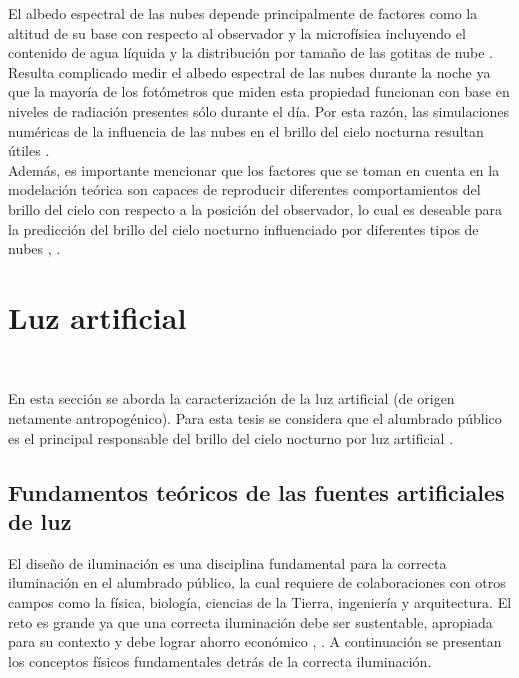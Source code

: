 El albedo espectral de las nubes depende principalmente de factores como la altitud de su base con respecto al observador y la microfísica incluyendo el contenido de agua líquida y la distribución por tamaño de las gotitas de nube \citep{Kocifaj2007}.\\ 

Resulta complicado medir el albedo espectral de las nubes durante la noche ya que la mayoría de los fotómetros que miden esta propiedad funcionan con base en niveles de radiación presentes sólo durante el día. Por esta razón, las simulaciones numéricas de la influencia de las nubes en el brillo del cielo nocturna resultan útiles \citep{Solano2015}.\\

Además, es importante mencionar que los factores que se toman en cuenta en la modelación teórica son capaces de reproducir diferentes comportamientos del brillo del cielo con respecto a la posición del observador, lo cual es deseable para la predicción del brillo del cielo nocturno influenciado por diferentes tipos de nubes \citep{Kocifaj2007}, \citep{Solano2015}.

\newpage

\section{Luz artificial}\\
\label{sec:luzartificial}

En esta sección se aborda la caracterización de la luz artificial (de origen netamente antropogénico). Para esta tesis se considera que el alumbrado público es el principal responsable del brillo del cielo nocturno por luz artificial \citep{Solano2013b}.

\subsection{Fundamentos teóricos de las fuentes artificiales de luz}

El diseño de iluminación es una disciplina fundamental para la correcta iluminación en el alumbrado público, la cual requiere de colaboraciones con otros campos como la física, biología, ciencias de la Tierra, ingeniería y arquitectura. El reto es grande ya que una correcta iluminación debe ser sustentable, apropiada para su contexto y debe lograr ahorro económico \citep{LibroCL}, \citep{Globaldiscussion}. A continuación se presentan los conceptos físicos fundamentales detrás de la correcta iluminación.\\


